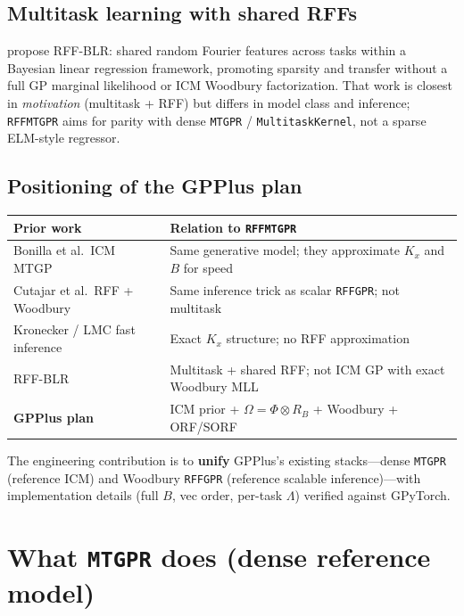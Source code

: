 \documentclass[11pt]{article}
\theoremstyle{plain}
\newcommand{\Ph}{\Phi}
\newcommand{\Om}{\Omega}
\newcommand{\RB}{R_B}
\begin{document}
\subsection{Multitask learning with shared RFFs}

\citet{sevilla2023rffblr} propose RFF-BLR: shared random Fourier features across tasks within a
Bayesian linear regression framework, promoting sparsity and transfer without a full GP
marginal likelihood or ICM Woodbury factorization.
That work is closest in \emph{motivation} (multitask + RFF) but differs in model class and
inference; \texttt{RFFMTGPR} aims for parity with dense \texttt{MTGPR} / \texttt{MultitaskKernel},
not a sparse ELM-style regressor.

\subsection{Positioning of the GPPlus plan}

\begin{center}
\renewcommand{\arraystretch}{1.25}
\begin{tabular}{@{}p{}p{}@{}}
\toprule
\textbf{Prior work} & \textbf{Relation to \texttt{RFFMTGPR}} \\
\midrule
Bonilla et al.\ ICM MTGP & Same generative model; they approximate $K_x$ and $B$ for speed \\
Cutajar et al.\ RFF + Woodbury & Same inference trick as scalar \texttt{RFFGPR}; not multitask \\
Kronecker / LMC fast inference & Exact $K_x$ structure; no RFF approximation \\
RFF-BLR & Multitask + shared RFF; not ICM GP with exact Woodbury MLL \\
\textbf{GPPlus plan} & ICM prior + $\Om=\Ph\otimes\RB$ + Woodbury + ORF/SORF \\
\bottomrule
\end{tabular}
\end{center}

The engineering contribution is to \textbf{unify} GPPlus's existing stacks---dense \texttt{MTGPR}
(reference ICM) and Woodbury \texttt{RFFGPR} (reference scalable inference)---with
implementation details (full $B$, vec order, per-task $\Lambda$) verified against GPyTorch.

\section{What \texttt{MTGPR} does (dense reference model)}
\label{sec:mtgpr}
\end{document}
